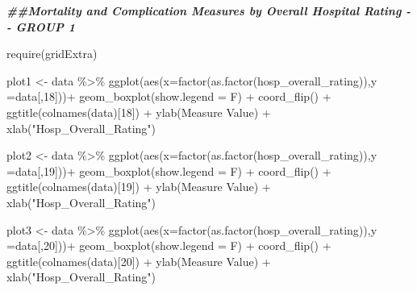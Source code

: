 \documentclass[
]{article}
\newenvironment{Shaded}{\begin{snugshade}}{\end{snugshade}}
\newcommand{\AttributeTok}[1]{\textcolor[rgb]{0.77,0.63,0.00}{#1}}
\newcommand{\DecValTok}[1]{\textcolor[rgb]{0.00,0.00,0.81}{#1}}
\newcommand{\DocumentationTok}[1]{\textcolor[rgb]{0.56,0.35,0.01}{\textbf{\textit{#1}}}}
\newcommand{\FunctionTok}[1]{\textcolor[rgb]{0.00,0.00,0.00}{#1}}
\newcommand{\NormalTok}[1]{#1}
\newcommand{\OtherTok}[1]{\textcolor[rgb]{0.56,0.35,0.01}{#1}}
\newcommand{\SpecialCharTok}[1]{\textcolor[rgb]{0.00,0.00,0.00}{#1}}
\newcommand{\StringTok}[1]{\textcolor[rgb]{0.31,0.60,0.02}{#1}}
\begin{document}
\begin{Shaded}
\begin{Highlighting}[]
\DocumentationTok{\#\#Mortality and Complication Measures by Overall Hospital Rating {-}{-} GROUP 1}

\FunctionTok{require}\NormalTok{(gridExtra)}


\NormalTok{plot1 }\OtherTok{\textless{}{-}}\NormalTok{ data }\SpecialCharTok{\%\textgreater{}\%} \FunctionTok{ggplot}\NormalTok{(}\FunctionTok{aes}\NormalTok{(}\AttributeTok{x=}\FunctionTok{factor}\NormalTok{(}\FunctionTok{as.factor}\NormalTok{(hosp\_overall\_rating)),}\AttributeTok{y =}\NormalTok{data[,}\DecValTok{18}\NormalTok{]))}\SpecialCharTok{+}
  \FunctionTok{geom\_boxplot}\NormalTok{(}\AttributeTok{show.legend =}\NormalTok{ F) }\SpecialCharTok{+}
  \FunctionTok{coord\_flip}\NormalTok{() }\SpecialCharTok{+}
  \FunctionTok{ggtitle}\NormalTok{(}\FunctionTok{colnames}\NormalTok{(data)[}\DecValTok{18}\NormalTok{]) }\SpecialCharTok{+} 
  \FunctionTok{ylab}\NormalTok{(}\StringTok{\textquotesingle{}Measure Value\textquotesingle{}}\NormalTok{) }\SpecialCharTok{+} \FunctionTok{xlab}\NormalTok{(}\StringTok{"Hosp\_Overall\_Rating"}\NormalTok{)}


\NormalTok{plot2 }\OtherTok{\textless{}{-}}\NormalTok{ data }\SpecialCharTok{\%\textgreater{}\%} \FunctionTok{ggplot}\NormalTok{(}\FunctionTok{aes}\NormalTok{(}\AttributeTok{x=}\FunctionTok{factor}\NormalTok{(}\FunctionTok{as.factor}\NormalTok{(hosp\_overall\_rating)),}\AttributeTok{y =}\NormalTok{data[,}\DecValTok{19}\NormalTok{]))}\SpecialCharTok{+}
  \FunctionTok{geom\_boxplot}\NormalTok{(}\AttributeTok{show.legend =}\NormalTok{ F) }\SpecialCharTok{+}
  \FunctionTok{coord\_flip}\NormalTok{() }\SpecialCharTok{+}
  \FunctionTok{ggtitle}\NormalTok{(}\FunctionTok{colnames}\NormalTok{(data)[}\DecValTok{19}\NormalTok{]) }\SpecialCharTok{+} 
  \FunctionTok{ylab}\NormalTok{(}\StringTok{\textquotesingle{}Measure Value\textquotesingle{}}\NormalTok{) }\SpecialCharTok{+} \FunctionTok{xlab}\NormalTok{(}\StringTok{"Hosp\_Overall\_Rating"}\NormalTok{)}

\NormalTok{plot3 }\OtherTok{\textless{}{-}}\NormalTok{ data }\SpecialCharTok{\%\textgreater{}\%} \FunctionTok{ggplot}\NormalTok{(}\FunctionTok{aes}\NormalTok{(}\AttributeTok{x=}\FunctionTok{factor}\NormalTok{(}\FunctionTok{as.factor}\NormalTok{(hosp\_overall\_rating)),}\AttributeTok{y =}\NormalTok{data[,}\DecValTok{20}\NormalTok{]))}\SpecialCharTok{+}
  \FunctionTok{geom\_boxplot}\NormalTok{(}\AttributeTok{show.legend =}\NormalTok{ F) }\SpecialCharTok{+}
  \FunctionTok{coord\_flip}\NormalTok{() }\SpecialCharTok{+}
  \FunctionTok{ggtitle}\NormalTok{(}\FunctionTok{colnames}\NormalTok{(data)[}\DecValTok{20}\NormalTok{]) }\SpecialCharTok{+} 
  \FunctionTok{ylab}\NormalTok{(}\StringTok{\textquotesingle{}Measure Value\textquotesingle{}}\NormalTok{) }\SpecialCharTok{+} \FunctionTok{xlab}\NormalTok{(}\StringTok{"Hosp\_Overall\_Rating"}\NormalTok{)}



\end{Highlighting}
\end{Shaded}
\end{document}
